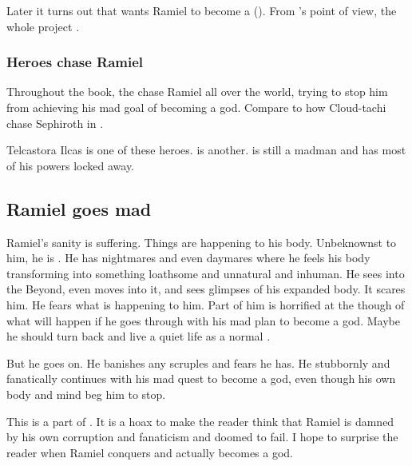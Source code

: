 Later it turns out that \Azraid wants Ramiel to become a \neoresphan ().
From \Azraid's point of view, the whole \malach project . 





\subsubsection{Heroes chase Ramiel}
Throughout the book, the  chase Ramiel all over the world, trying to stop him from achieving his mad goal of becoming a god. 
Compare to how Cloud-tachi chase Sephiroth in \cite{VideoGame:FinalFantasyVII}. 

Telcastora Ilcas is one of these heroes.
\Sithiyacaan is another. 
\Sithiyacaan is still a madman and has most of his powers locked away. 









\subsection{Ramiel goes mad}
Ramiel's sanity is suffering.
Things are happening to his body.
Unbeknownst to him, he is . 
He has nightmares and even daymares where he feels his body transforming into something loathsome and unnatural and inhuman. 
He sees into the Beyond, even moves into it, and sees glimpses of his expanded \neoresphan body.
It scares him. 
He fears what is happening to him. 
Part of him is horrified at the though of what will happen if he goes through with his mad plan to become a god. 
Maybe he should turn back and live a quiet life as a normal \human. 

But he goes on. 
He banishes any scruples and fears he has. 
He stubbornly and fanatically continues with his mad quest to become a god, even though his own body and mind beg him to stop. 

This is a part of . 
It is a hoax to make the reader think that Ramiel is damned by his own corruption and fanaticism and doomed to fail. 
I hope to surprise the reader when Ramiel conquers and actually becomes a god. 





